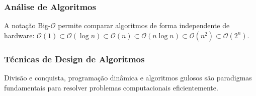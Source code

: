 \subsubsection*{Análise de Algoritmos}
A notação Big-$\mathcal{O}$ permite comparar algoritmos de forma independente de hardware:
$\mathcal{O}(1) \subset \mathcal{O}(\log n) \subset \mathcal{O}(n) \subset
\mathcal{O}(n \log n) \subset \mathcal{O}(n^2) \subset \mathcal{O}(2^n)$.

\subsubsection*{Técnicas de Design de Algoritmos}
Divisão e conquista, programação dinâmica e algoritmos gulosos são paradigmas fundamentais
para resolver problemas computacionais eficientemente.
